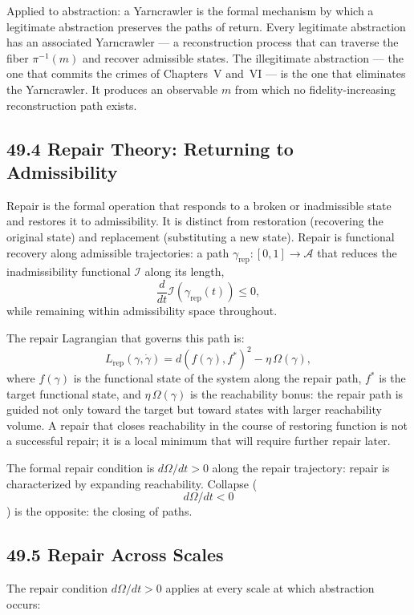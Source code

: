 \documentclass[12pt,letterpaper]{article}
\theoremstyle{remark}
\begin{document}
Applied to abstraction: a Yarncrawler is the formal mechanism by
which a legitimate abstraction preserves the paths of return.
Every legitimate abstraction has an associated Yarncrawler — a
reconstruction process that can traverse the fiber $\pi^{-1}(m)$
and recover admissible states. The illegitimate abstraction — the
one that commits the crimes of Chapters~V and~VI — is the one that
eliminates the Yarncrawler. It produces an observable $m$ from
which no fidelity-increasing reconstruction path exists.

\subsection{49.4 Repair Theory: Returning to Admissibility}

Repair is the formal operation that responds to a broken or
inadmissible state and restores it to admissibility. It is distinct
from restoration (recovering the original state) and replacement
(substituting a new state). Repair is functional recovery along
admissible trajectories: a path $\gamma_{\mathrm{rep}}: [0,1] \to
\mathcal{A}$ that reduces the inadmissibility functional
$\mathcal{I}$ along its length,
\[
\frac{d}{dt}\mathcal{I}(\gamma_{\mathrm{rep}}(t)) \leq 0,
\]
while remaining within admissibility space throughout.

The repair Lagrangian that governs this path is:
\[
L_{\mathrm{rep}}(\gamma, \dot\gamma) = d(f(\gamma), f^*)^2 -
\eta\,\Omega(\gamma),
\]
where $f(\gamma)$ is the functional state of the system along the
repair path, $f^*$ is the target functional state, and
$\eta\,\Omega(\gamma)$ is the reachability bonus: the repair path
is guided not only toward the target but toward states with larger
reachability volume. A repair that closes reachability in the
course of restoring function is not a successful repair; it is a
local minimum that will require further repair later.

The formal repair condition is $d\Omega/dt > 0$ along the repair
trajectory: repair is characterized by expanding reachability.
Collapse ($$d\Omega/dt < 0$$) is the opposite: the closing of paths.

\subsection{49.5 Repair Across Scales}

The repair condition $d\Omega/dt > 0$ applies at every scale at
which abstraction occurs:
\end{document}

